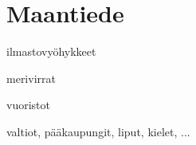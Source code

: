 \part*{Maantiede}
ilmastovyöhykkeet

merivirrat

vuoristot

valtiot, pääkaupungit, liput, kielet, ...